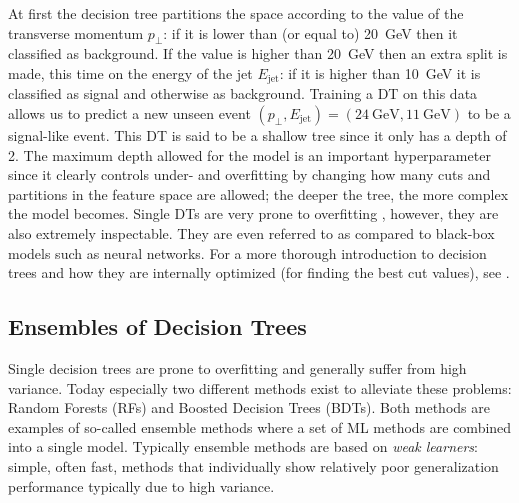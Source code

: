 At first the decision tree partitions the space according to the value of the transverse momentum $p_\perp$: if it is lower than (or equal to) \SI{20}{\GeV} then it classified as background. If the value is higher than \SI{20}{\GeV} then an extra split is made, this time on the energy of the jet $E_\mathrm{jet}$: if it is higher than \SI{10}{\GeV} it is classified as signal and otherwise as background. Training a DT on this data allows us to predict a new unseen event $(p_\perp, E_\mathrm{jet}) = (\SI{24}{\GeV},\SI{11}{\GeV})$ to be a signal-like event. This DT is said to be a shallow tree since it only has a depth of \num{2}. The maximum depth allowed for the model is an important hyperparameter since it clearly controls under- and overfitting by changing how many cuts and partitions in the feature space are allowed; the deeper the tree, the more complex the model becomes. Single DTs are very prone to overfitting
, however, they are also extremely inspectable. They are even referred to as  compared to black-box models such as neural networks. For a more thorough introduction to decision trees and how they are internally optimized (for finding the best cut values), see \citet{hastieElementsStatisticalLearning2009}. 

\subsection{Ensembles of Decision Trees}
\label{subsec:ml:multiple_decision_trees}
Single decision trees are prone to overfitting and generally suffer from high variance. Today especially two different methods exist to alleviate these problems: Random Forests (RFs) and Boosted Decision Trees (BDTs). Both methods are examples of so-called ensemble methods where a set of ML methods are combined into a single model. Typically ensemble methods are based on \emph{weak learners}: simple, often fast, methods that individually show relatively poor generalization performance typically due to high variance. 

